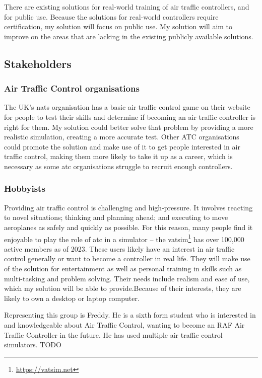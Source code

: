 \documentclass{article}
\begin{document}
There are existing solutions for real-world training of air traffic controllers, and for public use.
Because the solutions for real-world controllers require certification, my solution will focus on public use.
My solution will aim to improve on the areas that are lacking in the existing publicly available solutions.


\subsection{Stakeholders}
\subsubsection{Air Traffic Control organisations}
The UK's \acrfull{nats} organisation has a basic air traffic control game on their website for people to test their skills and determine if becoming an air traffic controller is right for them.
My solution could better solve that problem by providing a more realistic simulation, creating a more accurate test.
Other ATC organisations could promote the solution and make use of it to get people interested in air traffic control, making them more likely to take it up as a career, which is necessary as some \acrshort{atc} organisations struggle to recruit enough controllers\cite{indiaatcshortage}.

\subsubsection{Hobbyists}
Providing air traffic control is challenging and high-pressure.
It involves reacting to novel situations; thinking and planning ahead; and executing to move aeroplanes as safely and quickly as possible\cite{natsbuzz}.
For this reason, many people find it enjoyable to play the role of \acrshort{atc} in a simulator -- the \acrfull{vatsim}\footnote{\url{https://vatsim.net}} has over 100,000 active members as of 2023.
These users likely have an interest in air traffic control generally or want to become a controller in real life.
They will make use of the solution for entertainment as well as personal training in skills such as multi-tasking and problem solving.
Their needs include realism and ease of use, which my solution will be able to provide.Because of their interests, they are likely to own a desktop or laptop computer.

Representing this group is Freddy.
He is a sixth form student who is interested in and knowledgeable about Air Traffic Control, wanting to become an RAF Air Traffic Controller in the future.
He has used multiple air traffic control simulators.
TODO
\end{document}
